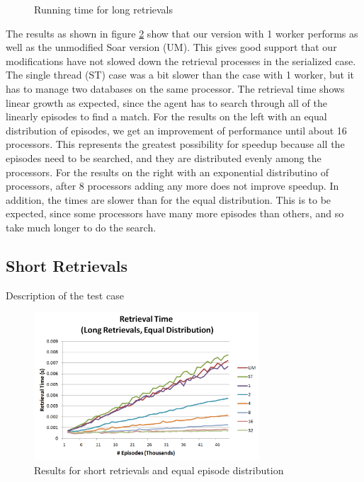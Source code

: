 \documentclass[11pt]{article} %
\begin{document}
\begin{figure}
\begin{subfigure}[b]{0.55\textwidth}
                \label{fig:retlexp}
        \end{subfigure}
        \caption{Running time for long retrievals}\label{fig:animals}
	\label{fig:long}
\end{figure}

The results as shown in figure \ref{fig:long} show that our version with 1 worker performs as well as the unmodified Soar version (UM). This gives good support that our modifications have not slowed down the retrieval processes in the serialized case. The single thread (ST) case was a bit slower than the case with 1 worker, but it has to manage two databases on the same processor. The retrieval time shows linear growth as expected, since the agent has to search through all of the linearly episodes to find a match. For the results on the left with an equal distribution of episodes, we get an improvement of performance until about 16 processors. This represents the greatest possibility for speedup because all the episodes need to be searched, and they are distributed evenly among the processors. For the results on the right with an exponential distributino of processors, after 8 processors adding any more does not improve speedup. In addition, the times are slower than for the equal distribution. This is to be expected, since some processors have many more episodes than others, and so take much longer to do the search. 


\subsection{Short Retrievals}
Description of the test case
\begin{figure}[h]
\caption{Results for short retrievals and equal episode distribution}
\centering
\includegraphics[width=0.75\textwidth]{images/ret_worst_eq}
\end{figure}
\end{document}
